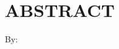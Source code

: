 \clearpage
\chapter*{ABSTRACT}

\begin{center}
    \center
    \begin{singlespace}
        \large\bfseries\MakeUppercase{}
    
        \normalfont\normalsize
        By:
    
        \bfseries \theauthor
    \end{singlespace}
\end{center} 


    
\clearpage

\clearpage